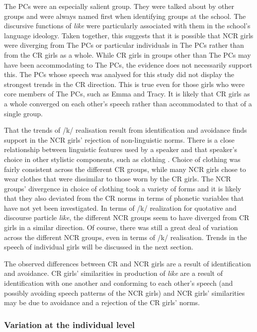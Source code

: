 The PCs were an especially salient group. They were talked about by other groups and were always named first when identifying groups at the school. The discursive functions of \textit{like} were particularly associated with them in the school's language ideology. Taken together, this suggests that it is possible that NCR girls were diverging from The PCs or particular individuals in The PCs rather than from the CR girls as a whole. While CR girls in groups other than The PCs may have been accommodating to The PCs, the evidence does not necessarily support this. The PCs whose speech was analysed for this study did not display the strongest trends in the CR direction. This is true even for those girls who were core members of The PCs, such as Emma and Tracy. It is likely that CR girls as a whole converged on each other's speech rather than accommodated to that of a single group.

That the trends of /k/ realisation result from identification and avoidance finds support in the NCR girls' rejection of non-linguistic norms. There is a close relationship between linguistic features used by a speaker and that speaker's choice in other stylistic components, such as clothing \citep[89]{bourdieu1991}. Choice of clothing was fairly consistent across the different CR groups, while many NCR girls chose to wear clothes that were dissimilar to those worn by the CR girls. The NCR groups' divergence in choice of clothing took a variety of forms and it is likely that they also deviated from the CR norms in terms of phonetic variables that have not yet been investigated. In terms of /k/ realization for quotative and discourse particle \textit{like}, the different NCR groups seem to have diverged from CR girls in a similar direction. Of course, there was still a great deal of variation across the different NCR groups, even in terms of /k/ realisation. Trends in the speech of individual girls will be discussed in the next section.

The observed differences between CR and NCR girls are a result of identification and avoidance. CR girls' similarities in production of \textit{like} are a result of identification with one another and conforming to each other's speech (and possibly avoiding speech patterns of the NCR girls) and NCR girls' similarities may be due to avoidance and a rejection of the CR girls' norms.




\subsubsection{Variation at the individual level}\label{theindividual}

